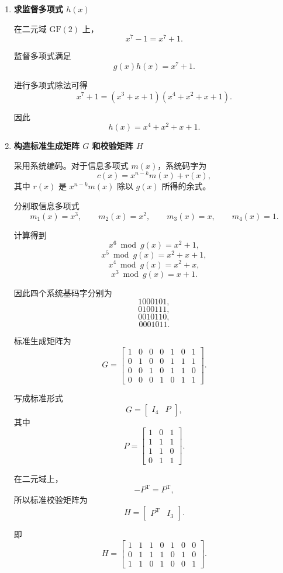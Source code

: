 \documentclass[UTF8,a4paper,12pt]{ctexart}
\begin{document}
\begin{enumerate}[label=\arabic*., leftmargin=2.2em]

\item \textbf{求监督多项式 $h(x)$}

在二元域 $\mathrm{GF}(2)$ 上，
\[
x^7-1=x^7+1.
\]

监督多项式满足
\[
g(x)h(x)=x^7+1.
\]

进行多项式除法可得
\[
x^7+1
=
(x^3+x+1)(x^4+x^2+x+1).
\]

因此
\[
\boxed{
h(x)=x^4+x^2+x+1
}.
\]


\item \textbf{构造标准生成矩阵 $G$ 和校验矩阵 $H$}

采用系统编码。对于信息多项式 $m(x)$，系统码字为
\[
c(x)=x^{n-k}m(x)+r(x),
\]
其中 $r(x)$ 是 $x^{n-k}m(x)$ 除以 $g(x)$ 所得的余式。

分别取信息多项式
\[
m_1(x)=x^3,\qquad
m_2(x)=x^2,\qquad
m_3(x)=x,\qquad
m_4(x)=1.
\]

计算得到
\[
x^6\bmod g(x)=x^2+1,
\]
\[
x^5\bmod g(x)=x^2+x+1,
\]
\[
x^4\bmod g(x)=x^2+x,
\]
\[
x^3\bmod g(x)=x+1.
\]

因此四个系统基码字分别为
\[
1000101,
\]
\[
0100111,
\]
\[
0010110,
\]
\[
0001011.
\]

标准生成矩阵为
\[
\boxed{
G=
\begin{bmatrix}
1&0&0&0&1&0&1\\
0&1&0&0&1&1&1\\
0&0&1&0&1&1&0\\
0&0&0&1&0&1&1
\end{bmatrix}
}.
\]

写成标准形式
\[
G=
\begin{bmatrix}
I_4&P
\end{bmatrix},
\]
其中
\[
P=
\begin{bmatrix}
1&0&1\\
1&1&1\\
1&1&0\\
0&1&1
\end{bmatrix}.
\]

在二元域上，
\[
-P^{\mathrm T}=P^{\mathrm T},
\]
所以标准校验矩阵为
\[
H=
\begin{bmatrix}
P^{\mathrm T}&I_3
\end{bmatrix}.
\]

即
\[
\boxed{
H=
\begin{bmatrix}
1&1&1&0&1&0&0\\
0&1&1&1&0&1&0\\
1&1&0&1&0&0&1
\end{bmatrix}
}.
\]


\end{enumerate}
\end{document}
